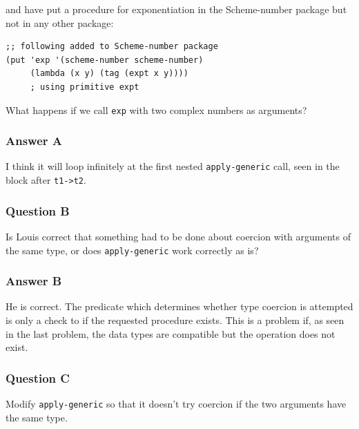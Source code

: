 \documentclass[final,fleqn,titlepage,twoside]{article}
\begin{document}
and have put a procedure for exponentiation in the Scheme-number package but not
in any other package:

\begin{verbatim}
;; following added to Scheme-number package
(put 'exp '(scheme-number scheme-number)
     (lambda (x y) (tag (expt x y))))
     ; using primitive expt
\end{verbatim}

What happens if we call \texttt{exp} with two complex numbers as arguments?

\subsubsection{Answer A}
\label{sec:orgdb63326}
I think it will loop infinitely at the first nested \texttt{apply-generic}
call, seen in the block after \texttt{t1->t2}.

\subsubsection{Question B}
\label{sec:org32e4f94}
Is Louis correct that something had to be done about coercion with arguments of
the same type, or does \texttt{apply-generic} work correctly as is?

\subsubsection{Answer B}
\label{sec:org0ef2545}
He is correct. The predicate which determines whether type coercion is attempted is only a check to if the requested procedure exists. This is a problem if, as seen in the last problem, the data types are compatible but the operation does not exist.

\subsubsection{Question C}
\label{sec:org4e0b6b7}
Modify \texttt{apply-generic} so that it doesn't try coercion if the two
arguments have the same type.
\end{document}
